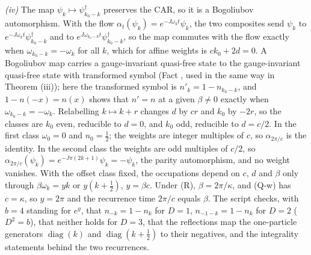 \emph{(iv)} The map $\psi_{k} \mapsto \psi_{k_{0} - k}^{\dagger}$ preserves the CAR, so it is a Bogoliubov automorphism. With the flow $\alpha_{t}(\psi_{k}) = e^{-J\omega_{k}t}\psi_{k}$, the two composites send $\psi_{k}$ to $e^{-J\omega_{k}t}\psi_{k_{0}-k}^{\dagger}$ and to $e^{J\omega_{k_{0}-k}t}\psi_{k_{0}-k}^{\dagger}$, so the map commutes with the flow exactly when $\omega_{k_{0} - k} = -\omega_{k}$ for all $k$, which for affine weights is $ck_{0} + 2d = 0$. A Bogoliubov map carries a gauge-invariant quasi-free state to the gauge-invariant quasi-free state with transformed symbol (Fact , used in the same way in Theorem (iii)); here the transformed symbol is $n'_{k} = 1 - n_{k_{0} - k}$, and $1 - n(-x) = n(x)$ shows that $n' = n$ at a given $\beta \neq 0$ exactly when $\omega_{k_{0}-k} = -\omega_{k}$. Relabelling $k \mapsto k + r$ changes $d$ by $cr$ and $k_{0}$ by $-2r$, so the classes are $k_{0}$ even, reducible to $d = 0$, and $k_{0}$ odd, reducible to $d = c/2$. In the first class $\omega_{0} = 0$ and $n_{0} = \tfrac12$; the weights are integer multiples of $c$, so $\alpha_{2\pi/c}$ is the identity. In the second class the weights are odd multiples of $c/2$, so $\alpha_{2\pi/c}(\psi_{k}) = e^{-J\pi(2k+1)}\psi_{k} = -\psi_{k}$, the parity automorphism, and no weight vanishes. With the offset class fixed, the occupations depend on $c$, $d$ and $\beta$ only through $\beta\omega_{k} = y k$ or $y(k + \tfrac12)$, $y = \beta c$. Under (R), $\beta = 2\pi/\kappa$, and (Q-w) has $c = \kappa$, so $y = 2\pi$ and the recurrence time $2\pi/c$ equals $\beta$. The script checks, with $b = 4$ standing for $e^{y}$, that $n_{-k} = 1 - n_{k}$ for $D = 1$, $n_{-1-k} = 1 - n_{k}$ for $D = 2$ ($D^{2} = b$), that neither holds for $D = 3$, that the reflections map the one-particle generators $\operatorname{diag}(k)$ and $\operatorname{diag}(k + \tfrac12)$ to their negatives, and the integrality statements behind the two recurrences.

